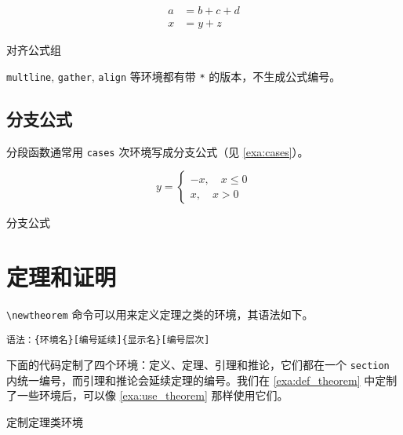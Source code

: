 \begin{example}[h]
\begin{RLDemo}[]
\begin{align}
a &= b+c+d \\
x &= y+z
\end{align}
\end{RLDemo}
\caption{对齐公式组}
\label{exa:align}
\end{example}

\texttt{multline}, \texttt{gather}, \texttt{align} 等环境都有带 \texttt{*} 的版本，不生成公式编号。

\subsection{分支公式}

分段函数通常用 \texttt{cases} 次环境写成分支公式（见 \autoref{exa:cases}）。

\begin{example}[!h]
\begin{RLDemo}[]
\[ y=\begin{cases}
    -x,\quad x\leq 0 \\
    x,\quad x>0
\end{cases} \]
\end{RLDemo}
\caption{分支公式}
\label{exa:cases}
\end{example}

\section{定理和证明}

\verb|\newtheorem| 命令可以用来定义定理之类的环境，其语法如下。

\verb|语法：{环境名}[编号延续]{显示名}[编号层次]|

下面的代码定制了四个环境：定义、定理、引理和推论，它们都在一个 \texttt{section} 内统一编号，而引理和推论会延续定理的编号。我们在 \autoref{exa:def_theorem} 中定制了一些环境后，可以像 \autoref{exa:use_theorem} 那样使用它们。

\begin{example}[h]
\begin{Code}[]
\newtheorem{definition}{`定义`}[section]
\newtheorem{theorem}{`定理`}[section]
\newtheorem{lemma}[theorem]{`引理`}
\newtheorem{corollary}[theorem]{`推论`}
\end{Code}
\caption{定制定理类环境}
\label{exa:def_theorem}
\end{example}

\newtheorem{definition}{定义}[section]
\newtheorem{theorem}{定理}[section]
\newtheorem{lemma}[theorem]{引理}
\newtheorem{corollary}[theorem]{推论}

